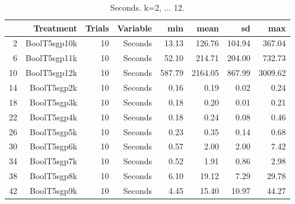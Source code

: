 \begin{table}[ht]
\centering
\begin{tabular}{rrrrrrrr}
  \hline
 & Treatment & Trials & Variable & min & mean & sd & max \\ 
  \hline
2 & BoolT5sgp10k &  10 & Seconds & 13.13 & 126.76 & 104.94 & 367.04 \\ 
  6 & BoolT5sgp11k &  10 & Seconds & 52.10 & 214.71 & 204.00 & 732.73 \\ 
  10 & BoolT5sgp12k &  10 & Seconds & 587.79 & 2164.05 & 867.99 & 3009.62 \\ 
  14 & BoolT5sgp2k &  10 & Seconds & 0.16 & 0.19 & 0.02 & 0.24 \\ 
  18 & BoolT5sgp3k &  10 & Seconds & 0.18 & 0.20 & 0.01 & 0.21 \\ 
  22 & BoolT5sgp4k &  10 & Seconds & 0.18 & 0.24 & 0.08 & 0.46 \\ 
  26 & BoolT5sgp5k &  10 & Seconds & 0.23 & 0.35 & 0.14 & 0.68 \\ 
  30 & BoolT5sgp6k &  10 & Seconds & 0.57 & 2.00 & 2.00 & 7.42 \\ 
  34 & BoolT5sgp7k &  10 & Seconds & 0.52 & 1.91 & 0.86 & 2.98 \\ 
  38 & BoolT5sgp8k &  10 & Seconds & 6.10 & 19.12 & 7.29 & 29.78 \\ 
  42 & BoolT5sgp9k &  10 & Seconds & 4.45 & 15.40 & 10.97 & 44.27 \\ 
   \hline
\end{tabular}
\caption{Seconds. k=2, ... 12.} 
\end{table}
